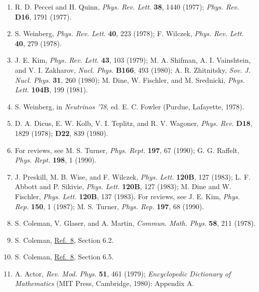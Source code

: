 \begin{enumerate}
\item {}\label{ch23-ref-30}
R. D. Peccei and H. Quinn, \emph{Phys. Rev. Lett.} \textbf{38}, 1440
(1977); \emph{Phys. Rev.} \textbf{D16}, 1791 (1977).

\item {}\label{ch23-ref-31}
S. Weinberg, \emph{Phys. Rev. Lett.} \textbf{40}, 223 (1978);
F. Wilczek, \emph{Phys. Rev. Lett.} \textbf{40}, 279 (1978).

\item {}\label{ch23-ref-32}
J. E. Kim, \emph{Phys. Rev. Lett.} \textbf{43}, 103 (1979);
M. A. Shifman, A. I. Vainshtein, and V. I. Zakharov,
\emph{Nucl. Phys.} \textbf{B166}, 493 (1980); A. R. Zhitnitsky,
\emph{Sov. J. Nucl. Phys.} \textbf{31}, 260 (1980); M. Dine,
W. Fischler, and M. Srednicki, \emph{Phys. Lett.} \textbf{104B}, 199
(1981).

\item {}\label{ch23-ref-33}
S. Weinberg, in \emph{Neutrinos '78}, ed. E. C. Fowler (Purdue,
Lafayette, 1978).

\item {}\label{ch23-ref-34}
D. A. Dicus, E. W. Kolb, V. I. Teplitz, and R. V. Wagoner,
\emph{Phys. Rev.} \textbf{D18}, 1829 (1978); \textbf{D22}, 839 (1980).

\item {}\label{ch23-ref-35}
For reviews, see M. S. Turner, \emph{Phys. Rept.} \textbf{197}, 67
(1990); G. G. Raffelt, \emph{Phys. Rept.} \textbf{198}, 1 (1990).

\item {}\label{ch23-ref-36}
J. Preskill, M. B. Wise, and F. Wilczek, \emph{Phys. Lett.}
\textbf{120B}, 127 (1983); L. F. Abbott and P. Sikivie,
\emph{Phys. Lett.} \textbf{120B}, 127 (1983); M. Dine and W. Fischler,
\emph{Phys. Lett.} \textbf{120B}, 137 (1983). For reviews, see J. E. Kim,
\emph{Phys. Rep.} \textbf{150}, 1 (1987); M. S. Turner,
\emph{Phys. Rep.} \textbf{197}, 68 (1990).

\item {}\label{ch23-ref-37}
S. Coleman, V. Glaser, and A. Martin, \emph{Commun. Math. Phys.}
\textbf{58}, 211 (1978).

\item {}\label{ch23-ref-38}
S. Coleman, \hyperref[ch23-ref-8]{Ref.~8}, Section 6.2.

\item {}\label{ch23-ref-39}
S. Coleman, \hyperref[ch23-ref-8]{Ref.~8}, Section 6.5.

\item {}\label{ch23-ref-40}
A. Actor, \emph{Rev. Mod. Phys.} \textbf{51}, 461 (1979);
\emph{Encyclopedic Dictionary of Mathematics} (MIT Press, Cambridge,
1980): Appendix A.
\end{enumerate}
